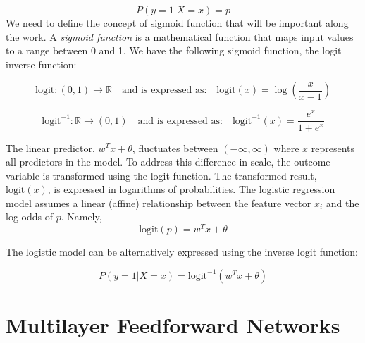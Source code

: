 \documentclass[../main.tex]{subfiles}
\begin{document}
$$P(y = 1 | X = x) = p $$
We need to define the concept of sigmoid function that will be important along the work. A \textit{sigmoid function} is a mathematical function that maps input values to a range between 0 and 1. We have the following sigmoid function, the logit inverse function:

\[
\text{logit}: (0,1) \to \mathbb{R}
\quad \text{and is expressed as:} \quad
\text{logit}(x) = \log\left(\frac{x}{x-1}\right)
\]


\[
\text{logit}^{-1}: \mathbb{R} \to (0,1)
\quad \text{and is expressed as:} \quad
\text{logit}^{-1}(x) = \frac{e^x}{1+e^x}
\]

\noindent The linear predictor, $ w^T x +\theta$, fluctuates between $(-\infty,\infty)$ where $x$ represents all predictors in the model. To address this difference in scale, the outcome variable is transformed using the logit function. The transformed result, $\text{logit}(x)$, is expressed in logarithms of probabilities. 
The logistic regression model assumes a linear (affine) relationship between the feature vector $x_i$ and the log odds of $p$. Namely,
$$\text{logit}(p) = w^T x +\theta$$

The logistic model can be alternatively expressed using the inverse logit function:

\[
P(y = 1 | X=x) = \text{logit}^{-1}(w^T x +\theta)
\]




\section{Multilayer Feedforward Networks}
	
\end{document}
